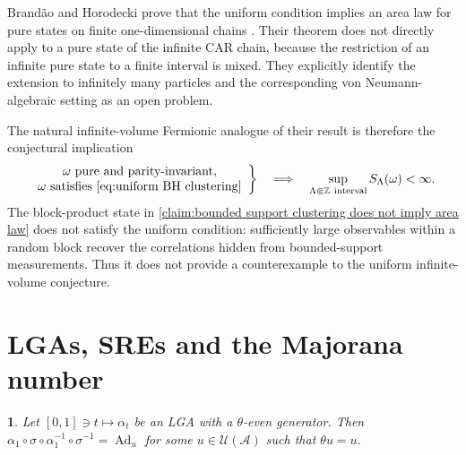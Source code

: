 \documentclass[a4paper,10pt]{article}
\numberwithin{equation}{section}
\theoremstyle{plain}
\theoremstyle{plain}
\theoremstyle{plain}
\theoremstyle{plain}
\theoremstyle{plain}
\newtheorem{claim}[claim]{\protect\claimname}
\theoremstyle{remark}
\theoremstyle{definition}
\providecommand{\claimname}{Claim}
\newcommand{\ZZ}{\mathbb{Z}}
\newcommand{\calA}{\mathcal{A}}
\newcommand{\calU}{\mathcal{U}}
\newcommand{\Ad}[1]{\operatorname{Ad}_{#1}}
\newcommand{\eq}[1]{\begin{align*}#1\end{align*}}
\begin{document}
Brand{\~a}o and Horodecki prove that the uniform condition implies an
area law for pure states on finite one-dimensional chains
\cite{BrandaoHorodecki2015AreaLaw}. Their theorem does not directly
apply to a pure state of the infinite CAR chain, because the
restriction of an infinite pure state to a finite interval is mixed.
They explicitly identify the extension to infinitely many particles
and the corresponding von Neumann-algebraic setting as an open
problem.

The natural infinite-volume Fermionic analogue of their result is
therefore the conjectural implication
\eq{
    \left.
    \begin{array}{c}
    \omega\text{ pure and parity-invariant},\\
    \omega\text{ satisfies }
    \cref{eq:uniform BH clustering}
    \end{array}
    \right\}
    \quad
    \Longrightarrow
    \quad
    \sup_{
        \Lambda\Subset\ZZ\
        \mathrm{interval}
    }
    S_\Lambda(\omega)
    <
    \infty.
}
The block-product state in
\cref{claim:bounded support clustering does not imply area law} does
not satisfy the uniform condition: sufficiently large observables
within a random block recover the correlations hidden from
bounded-support measurements. Thus it does not provide a counterexample
to the uniform infinite-volume conjecture.
\section{LGAs, SREs and the Majorana number}
\label{sec:LGAs SREs}

\begin{claim}
    Let $[0,1] \ni t \mapsto \alpha_t$ be an LGA with a $\theta$-even generator. Then $\alpha_1\circ\sigma\circ\alpha_1^{-1}\circ\sigma^{-1}=\Ad{u}$ for some $u\in\calU(\calA)$ such that $\theta u = u$.
\end{claim}
\end{document}
